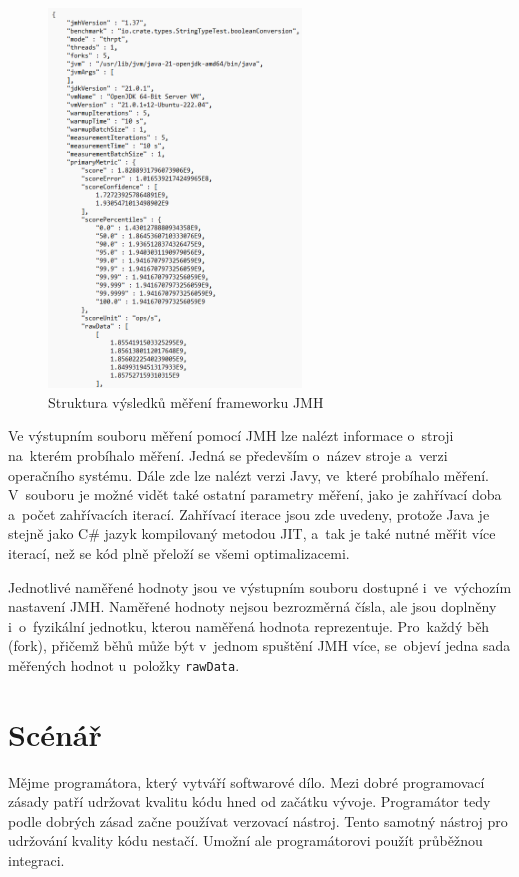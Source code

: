 \begin{figure}[!ht]
    \centering
    \includegraphics[width=0.6\textwidth]{../img/JMH-example.png}
    \caption{Struktura výsledků měření frameworku JMH}
\end{figure}

Ve výstupním souboru měření pomocí JMH lze nalézt informace o~stroji na~kterém probíhalo měření.
Jedná se především o~název stroje a~verzi operačního systému. Dále zde lze nalézt verzi Javy,
ve~které probíhalo měření. V~souboru je možné vidět také ostatní parametry měření, jako je
zahřívací doba a~počet zahřívacích iterací. Zahřívací iterace jsou zde uvedeny, protože Java
je stejně jako C\# jazyk kompilovaný metodou JIT, a~tak je také nutné měřit více iterací, než se kód
plně přeloží se všemi optimalizacemi.

Jednotlivé naměřené hodnoty jsou ve výstupním souboru dostupné i~ve~výchozím nastavení JMH.
Naměřené hodnoty nejsou bezrozměrná čísla, ale jsou doplněny i~o~fyzikální jednotku,
kterou naměřená hodnota reprezentuje. Pro~každý běh (fork), přičemž běhů může být v~jednom
spuštění JMH více, se~objeví jedna sada měřených hodnot u~položky \lstinline|rawData|.

\section{Scénář}

Mějme programátora, který vytváří softwarové dílo. Mezi dobré programovací zásady patří udržovat kvalitu kódu
hned od začátku vývoje. Programátor tedy podle dobrých zásad začne používat verzovací nástroj.
Tento samotný nástroj pro udržování kvality kódu nestačí. Umožní ale programátorovi použít průběžnou integraci.

